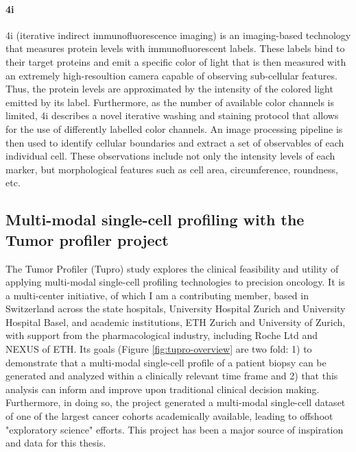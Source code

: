 \paragraph{4i} %
4i (iterative indirect immunofluorescence imaging) \cite{gut2018}
is an imaging-based technology that measures protein levels with immunofluorescent labels.
These labels bind to their target proteins and emit a specific color of light
that is then measured with an extremely high-resoultion camera capable of observing sub-cellular features.
Thus, the protein levels are approximated by the intensity of the colored light emitted by its label.
Furthermore, as the number of available color channels is limited,
4i describes a novel iterative washing and staining protocol that allows for the use of differently labelled color channels.
An image processing pipeline is then used to identify cellular boundaries and extract a set of observables of each individual cell.
These observations include not only the intensity levels of each marker, but morphological features such as cell area, circumference, roundness, etc.

\subsection{Multi-modal single-cell profiling with the Tumor profiler project}
The Tumor Profiler (Tupro) study \cite{irmisch2021} explores the clinical feasibility and utility of applying multi-modal single-cell profiling technologies to precision oncology.
It is a multi-center initiative, of which I am a contributing member, based in Switzerland across the state hospitals, University Hospital Zurich and University Hospital Basel, and academic institutions, ETH Zurich and University of Zurich, with support from the pharmacological industry, including Roche Ltd and NEXUS of ETH.
Its goals (Figure \ref{fig:tupro-overview} are two fold:
1) to demonstrate that a multi-modal single-cell profile of a patient biopsy can be generated and analyzed within a clinically relevant time frame
and 2) that this analysis can inform and improve upon traditional clinical decision making.
Furthermore, in doing so, the project generated a multi-modal single-cell dataset of one of the largest cancer cohorts academically available,
leading to offshoot "exploratory science" efforts.
This project has been a major source of inspiration and data for this thesis.

